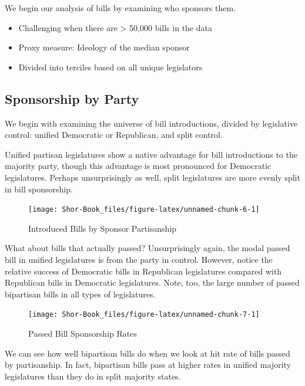 \documentclass[
  oneside]{book}
\providecommand{\tightlist}{%
  \setlength{\itemsep}{0pt}\setlength{\parskip}{0pt}}
\begin{document}
We begin our analysis of bills by examining who sponsors them.

\begin{itemize}
\tightlist
\item
  Challenging when there are \textgreater{} 50,000 bills in the data
\item
  Proxy measure: Ideology of the median sponsor
\item
  Divided into terciles based on all unique legislators
\end{itemize}

\hypertarget{sponsorship-by-party}{%
\subsection{Sponsorship by Party}\label{sponsorship-by-party}}

We begin with examining the universe of bill introductions, divided by legislative control: unified Democratic or Republican, and split control.

Unified partisan legislatures show a native advantage for bill introductions to the majority party, though this advantage is most pronounced for Democratic legislatures. Perhaps unsurprisingly as well, split legislatures are more evenly split in bill sponsorship.

\begin{figure}
\texttt{[image: Shor-Book\_files/figure-latex/unnamed-chunk-6-1]} \caption{Introduced Bills by Sponsor Partisanship}\label{fig:unnamed-chunk-6}
\end{figure}

What about bills that actually passed? Unsurprisingly again, the modal passed bill in unified legislatures is from the party in control. However, notice the relative success of Democratic bills in Republican legislatures compared with Republican bills in Democratic legislatures. Note, too, the large number of passed bipartisan bills in all types of legislatures.

\begin{figure}
\texttt{[image: Shor-Book\_files/figure-latex/unnamed-chunk-7-1]} \caption{Passed Bill Sponsorship Rates}\label{fig:unnamed-chunk-7}
\end{figure}

We can see how well bipartisan bills do when we look at hit rate of bills passed by partisanship. In fact, bipartisan bills pass at higher rates in unified majority legislatures than they do in split majority states.
\end{document}
